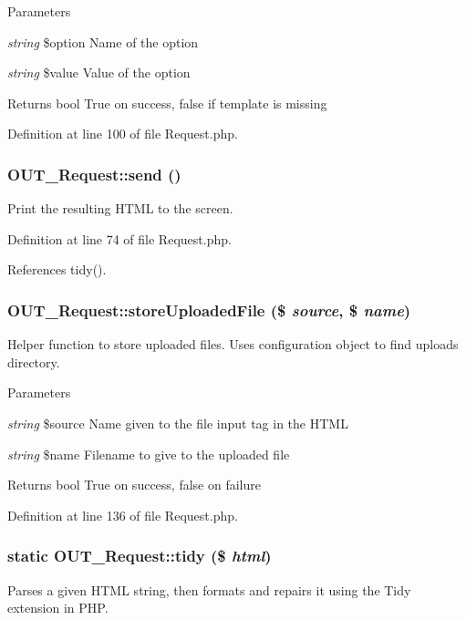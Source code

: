 \begin{DoxyParams}{Parameters}
\item[{\em string}]\$option Name of the option \item[{\em string}]\$value Value of the option\end{DoxyParams}
\begin{DoxyReturn}{Returns}
bool True on success, false if template is missing 
\end{DoxyReturn}


Definition at line 100 of file Request.php.\hypertarget{classOUT__Request_acc60e320923329be1aa103406a4a3ee9}{
\subsubsection[{send}]{\setlength{\rightskip}{0pt plus 5cm}OUT\_\-Request::send ()}}
\label{de/d53/classOUT__Request_acc60e320923329be1aa103406a4a3ee9}
Print the resulting HTML to the screen. 

Definition at line 74 of file Request.php.

References tidy().\hypertarget{classOUT__Request_a9b012befff9ae7c85396d42989067d83}{
\subsubsection[{storeUploadedFile}]{\setlength{\rightskip}{0pt plus 5cm}OUT\_\-Request::storeUploadedFile (\$ {\em source}, \/  \$ {\em name})}}
\label{de/d53/classOUT__Request_a9b012befff9ae7c85396d42989067d83}
Helper function to store uploaded files. Uses configuration object to find uploads directory.


\begin{DoxyParams}{Parameters}
\item[{\em string}]\$source Name given to the file input tag in the HTML \item[{\em string}]\$name Filename to give to the uploaded file\end{DoxyParams}
\begin{DoxyReturn}{Returns}
bool True on success, false on failure 
\end{DoxyReturn}


Definition at line 136 of file Request.php.\hypertarget{classOUT__Request_a7106b7d90946eacf1688d089c12722f0}{
\subsubsection[{tidy}]{\setlength{\rightskip}{0pt plus 5cm}static OUT\_\-Request::tidy (\$ {\em html})}}
\label{de/d53/classOUT__Request_a7106b7d90946eacf1688d089c12722f0}
Parses a given HTML string, then formats and repairs it using the Tidy extension in PHP.


